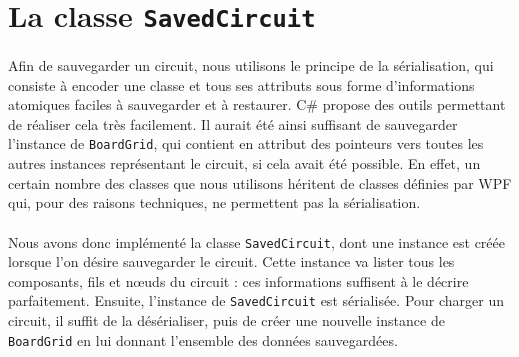 \section{La classe \lstinline|SavedCircuit|}

\paragraph{}Afin de sauvegarder un circuit, nous utilisons le principe de la sérialisation, qui consiste à encoder une classe et tous ses attributs sous forme d'informations atomiques faciles à sauvegarder et à restaurer. C\# propose des outils permettant de réaliser cela très facilement. Il aurait été ainsi suffisant de sauvegarder l'instance de \lstinline|BoardGrid|, qui contient en attribut des pointeurs vers toutes les autres instances représentant le circuit, si cela avait été possible. En effet, un certain nombre des classes que nous utilisons héritent de classes définies par WPF qui, pour des raisons techniques, ne permettent pas la sérialisation. 

\paragraph{}Nous avons donc implémenté la classe \lstinline|SavedCircuit|, dont une instance est créée lorsque l'on désire sauvegarder le circuit. Cette instance va lister tous les composants, fils et nœuds du circuit : ces informations suffisent à le décrire parfaitement. Ensuite, l'instance de \lstinline|SavedCircuit| est sérialisée. Pour charger un circuit, il suffit de la désérialiser, puis de créer une nouvelle instance de \lstinline|BoardGrid| en lui donnant l'ensemble des données sauvegardées.
